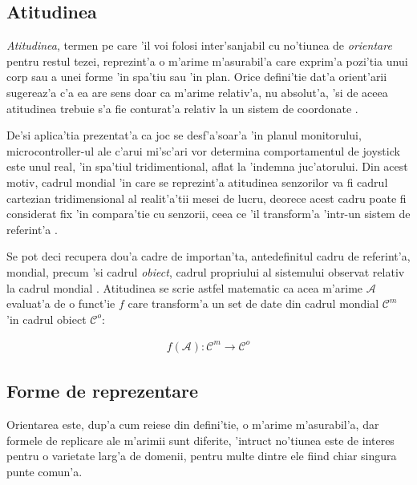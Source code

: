\documentclass[12pt,a4paper,twoside]{report}
\begin{document}
\subsection{Atitudinea}

\textit{Atitudinea}, termen pe care 'il voi folosi inter'sanjabil cu no'tiunea de \textit{ orientare} pentru restul tezei, reprezint'a o m'arime m'asurabil'a care exprim'a pozi'tia unui corp sau a unei forme 'in spa'tiu sau 'in plan. Orice defini'tie dat'a orient'arii sugereaz'a c'a ea are sens doar ca m'arime relativ'a, nu absolut'a, 'si de aceea atitudinea trebuie s'a fie conturat'a relativ la un sistem de coordonate \cite{article3}.

\vspace{5px}

De'si aplica'tia prezentat'a ca joc se desf'a'soar'a 'in planul monitorului, microcontroller-ul ale c'arui mi'sc'ari vor determina comportamentul de joystick este unul real, 'in spa'tiul tridimentional, aflat la 'indem\ia na juc'atorului. Din acest motiv, cadrul mondial 'in care se reprezint'a atitudinea senzorilor va fi cadrul cartezian tridimensional al realit'a'tii mesei de lucru, deorece acest cadru poate fi considerat fix 'in compara'tie cu senzorii, ceea ce 'il transform'a 'intr-un sistem de referint'a \cite{article3}. 

\vspace{5px}

Se pot deci recupera dou'a cadre de importan'ta, antedefinitul cadru de referint'a, mondial, precum 'si cadrul \textit{obiect}, cadrul propriului al sistemului observat relativ la cadrul mondial \cite{article3}. Atitudinea se scrie astfel matematic ca acea m'arime $\mathcal{A}$ evaluat'a de o funct'ie $f$ care transform'a un set de date din cadrul mondial $\mathcal{C}^m$ 'in cadrul obiect $\mathcal{C}^o$:

\begin{gather}
    f(\mathcal{A}) : \mathcal{C}^m \to \mathcal{C}^o
\end{gather}

\subsection{Forme de reprezentare}

Orientarea este, dup'a cum reiese din defini'tie, o m'arime m'asurabil'a, dar formele de replicare ale m'arimii sunt diferite, 'intruc\ia t no'tiunea este de interes pentru o varietate larg'a de domenii, pentru multe dintre ele fiind chiar singura punte comun'a. 
\end{document}
